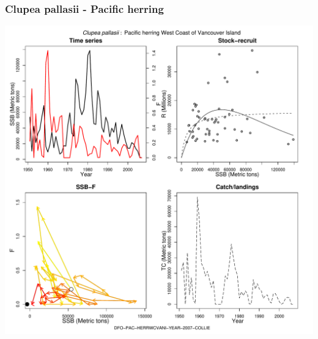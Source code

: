 \subsubsection{Clupea pallasii - Pacific herring}
\begin{center}
\includegraphics[width=1.2\textwidth]{../R/figures/DFO-PAC-HERRWCVANI-YEAR-2007-COLLIE.pdf}
\end{center}

